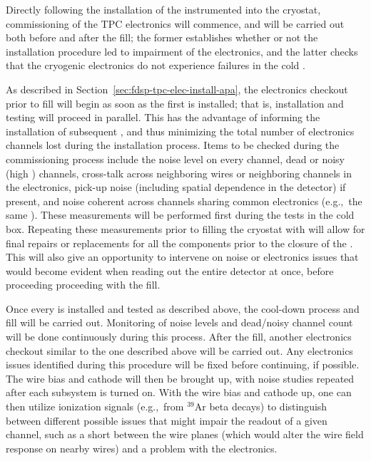 Directly following the installation of the instrumented  into the cryostat, commissioning of the
TPC electronics will commence, and will be carried out both before and after the \lar fill;
the former establishes whether or not the installation procedure led to impairment of the
electronics, and the latter checks that the cryogenic electronics do not experience failures
in the cold \lar.

As described in Section~\ref{sec:fdsp-tpc-elec-install-apa}, the electronics checkout prior to
\lar fill will begin as soon as the first  is installed; %
that is,
installation and testing will proceed in parallel.  This has the advantage of informing the 
 installation of subsequent , and thus minimizing the total number of electronics channels lost
during the installation process.  Items to be checked during the commissioning process include
the noise level on every channel, dead or noisy (high \rms) channels,
cross-talk across neighboring wires or neighboring channels in the electronics,
pick-up noise (including spatial dependence in the detector) if present, and
noise coherent across channels sharing common electronics (e.g.,~the same ).
These measurements will be performed first during the tests in the cold box.  Repeating these
measurements prior to filling the cryostat with \lar will allow for final repairs or replacements
for all the  components prior to the closure of the . This will also give an opportunity
to intervene on noise or electronics issues that would become evident when reading out
the entire detector at once, before proceeding proceeding with the \lar fill.

Once every  is installed and tested as described above, the cool-down process and \lar fill
will be carried out.  Monitoring of noise levels and dead/noisy channel count will be
done continuously during this process.  After the \lar fill, another electronics checkout
similar to the one described above will be carried out.  Any electronics issues identified
during this procedure will be fixed before continuing, if possible.  The wire bias  and
cathode  will then be brought up, with noise studies repeated after each subsystem is
turned on.  With the wire bias  and cathode  up, one can then utilize ionization signals
(e.g.,~from $\mathrm{{}^{39}Ar}$ beta decays) to distinguish between different possible issues
that might impair the readout of a given channel, such as a short between the wire planes
(which would alter the wire field response on nearby wires) and a problem with the electronics.

